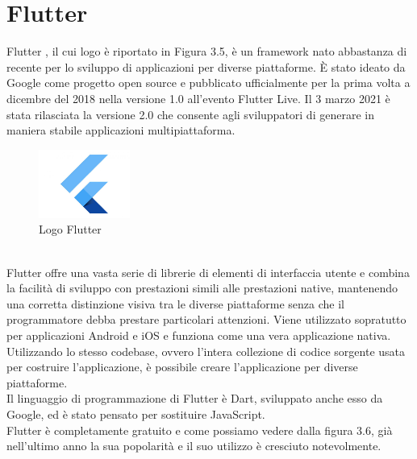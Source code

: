 \section{Flutter}
Flutter \cite{flutterprogramma,flutter,fluttermobile}, il cui logo è riportato in Figura 3.5, è un framework nato abbastanza di recente per lo sviluppo di applicazioni per diverse piattaforme.
È stato ideato da Google come progetto open source e pubblicato ufficialmente per la prima volta a dicembre del 2018 nella versione 1.0 all'evento Flutter Live.
Il 3 marzo 2021 è stata rilasciata la versione 2.0 che consente agli sviluppatori di generare in maniera stabile applicazioni multipiattaforma.
\\
\begin{figure}[htbp]	
	\centering
	\includegraphics[width=3cm]{immagini/flutterlogo.jpg}
	\caption{Logo Flutter}
	\label{fig:Logo Flutter}
\end{figure}
\\
Flutter offre una vasta serie di librerie di elementi di interfaccia utente e combina la facilità di sviluppo con prestazioni simili alle prestazioni native, mantenendo una corretta distinzione visiva tra le diverse piattaforme senza che il programmatore debba prestare particolari attenzioni.
Viene utilizzato sopratutto per applicazioni Android e iOS e funziona come una vera applicazione nativa.\\
Utilizzando lo stesso codebase, ovvero l'intera collezione di codice sorgente usata per costruire l'applicazione, è possibile creare l'applicazione per diverse piattaforme.\\
Il linguaggio di programmazione di Flutter è Dart, sviluppato anche esso da Google, ed è stato pensato per sostituire JavaScript.\\
Flutter è completamente gratuito e come possiamo vedere dalla figura 3.6, già nell'ultimo anno la sua popolarità e il suo utilizzo è cresciuto notevolmente.\\

